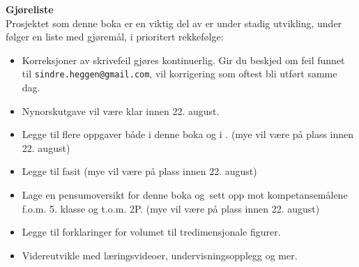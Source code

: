 \newpage
\textbf{Gjøreliste} \\
Prosjektet som denne boka er en viktig del av er under stadig utvikling, under følger en liste med gjøremål, i prioritert rekkefølge:
\begin{itemize}
	\item Korreksjoner av skrivefeil gjøres kontinuerlig. Gir du beskjed om feil funnet til {\tt sindre.heggen@gmail.com}, vil korrigering som oftest bli utført samme dag.
	\item Nynorskutgave vil være klar innen 22. august.
	\item Legge til flere oppgaver både i denne boka og i \mb. (mye vil være på plass innen 22. august)
	\item Legge til fasit (mye vil være på plass innen 22. august)
	\item Lage en pensumoversikt for denne boka og \mb\,sett opp mot kompetansemålene f.o.m. 5. klasse og t.o.m. 2P. (mye vil være på plass innen 22. august)
	\item Legge til forklaringer for volumet til tredimensjonale figurer.
	\item Videreutvikle  med læringsvideoer, undervisningsopplegg og mer. 
\end{itemize}
\newpage

